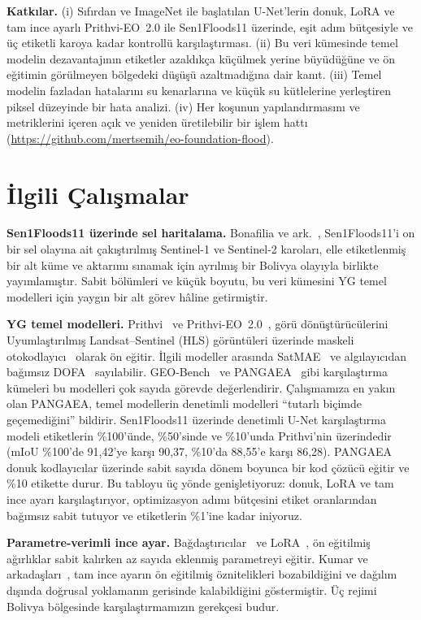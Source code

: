 \documentclass[conference]{IEEEtran}
\begin{document}
\textbf{Katkılar.} (i) Sıfırdan ve ImageNet ile başlatılan U-Net'lerin donuk, LoRA ve tam ince ayarlı Prithvi-EO~2.0 ile Sen1Floods11 üzerinde, eşit adım bütçesiyle ve üç etiketli karoya kadar kontrollü karşılaştırması. (ii) Bu veri kümesinde temel modelin dezavantajının etiketler azaldıkça küçülmek yerine büyüdüğüne ve ön eğitimin görülmeyen bölgedeki düşüşü azaltmadığına dair kanıt. (iii) Temel modelin fazladan hatalarını su kenarlarına ve küçük su kütlelerine yerleştiren piksel düzeyinde bir hata analizi. (iv) Her koşunun yapılandırmasını ve metriklerini içeren açık ve yeniden üretilebilir bir işlem hattı (\url{https://github.com/mertsemih/eo-foundation-flood}).

\section{İlgili Çalışmalar}
\textbf{Sen1Floods11 üzerinde sel haritalama.} Bonafilia ve ark.~\cite{bonafilia2020sen1floods11}, Sen1Floods11'i on bir sel olayına ait çakıştırılmış Sentinel-1 ve Sentinel-2 karoları, elle etiketlenmiş bir alt küme ve aktarımı sınamak için ayrılmış bir Bolivya olayıyla birlikte yayımlamıştır. Sabit bölümleri ve küçük boyutu, bu veri kümesini YG temel modelleri için yaygın bir alt görev hâline getirmiştir.

\textbf{YG temel modelleri.} Prithvi~\cite{jakubik2023prithvi} ve Prithvi-EO~2.0~\cite{szwarcman2024prithvi}, görü dönüştürücülerini~\cite{dosovitskiy2021vit} Uyumlaştırılmış Landsat--Sentinel (HLS) görüntüleri üzerinde maskeli otokodlayıcı~\cite{he2022mae} olarak ön eğitir. İlgili modeller arasında SatMAE~\cite{cong2022satmae} ve algılayıcıdan bağımsız DOFA~\cite{xiong2024dofa} sayılabilir. GEO-Bench~\cite{lacoste2023geobench} ve PANGAEA~\cite{marsocci2024pangaea} gibi karşılaştırma kümeleri bu modelleri çok sayıda görevde değerlendirir. Çalışmamıza en yakın olan PANGAEA, temel modellerin denetimli modelleri ``tutarlı biçimde geçemediğini'' bildirir. Sen1Floods11 üzerinde denetimli U-Net karşılaştırma modeli etiketlerin \%100'ünde, \%50'sinde ve \%10'unda Prithvi'nin üzerindedir (mIoU \%100'de 91,42'ye karşı 90,37, \%10'da 88,55'e karşı 86,28). PANGAEA donuk kodlayıcılar üzerinde sabit sayıda dönem boyunca bir kod çözücü eğitir ve \%10 etikette durur. Bu tabloyu üç yönde genişletiyoruz: donuk, LoRA ve tam ince ayarı karşılaştırıyor, optimizasyon adımı bütçesini etiket oranlarından bağımsız sabit tutuyor ve etiketlerin \%1'ine kadar iniyoruz.

\textbf{Parametre-verimli ince ayar.} Bağdaştırıcılar~\cite{houlsby2019adapters} ve LoRA~\cite{hu2021lora}, ön eğitilmiş ağırlıklar sabit kalırken az sayıda eklenmiş parametreyi eğitir. Kumar ve arkadaşları~\cite{kumar2022lpft}, tam ince ayarın ön eğitilmiş öznitelikleri bozabildiğini ve dağılım dışında doğrusal yoklamanın gerisinde kalabildiğini göstermiştir. Üç rejimi Bolivya bölgesinde karşılaştırmamızın gerekçesi budur.
\end{document}
